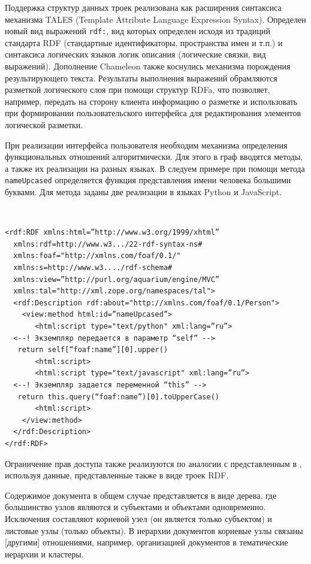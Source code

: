 \documentclass[utf8]{../IncArticle}
\newcommand{\e}[2][fcolor]{\textcolor{pcolor}{[}\textcolor{#1}{#2}\textcolor{pcolor}{]}}
\begin{document}
Поддержка структур данных троек реализована как расширения синтаксиса
механизма TALES (Template Attribute Language Expression
Syntax). Определен новый вид выражений \texttt{rdf:}, вид которых
определен исходя из традиций стандарта RDF (стандартные
идентификаторы, пространства имен и т.п.) и синтаксиса логических
языков логик описания (логические связки, вид выражений).  Дополнение
Chameleon также коснулись механизма порождения результирующего
текста. Результаты выполнения выражений обрамляются разметкой
логического слоя при помощи структур RDFa, что позволяет, например,
передать на сторону клиента информацию о разметке и использовать при
формировании пользовательского интерфейса для редактирования элементов
логической разметки.

При реализации интерфейса пользователя необходим механизма определения
функциональных отношений алгоритмически.  Для этого в граф вводятся
методы, а также их реализации на разных языках.  В следуем примере при
помощи метода \texttt{nameUpcased} определяется функция представления
имени человека большими буквами.  Для метода заданы две реализации в
языках Python и JavaScript.

\begingroup
\tt
\begin{verbatim}
<rdf:RDF xmlns:html=”http://www.w3.org/1999/xhtml”
  xmlns:rdf=http://www.w3.../22-rdf-syntax-ns#
  xmlns:foaf="http://xmlns.com/foaf/0.1/"
  xmlns:s=http://www.w3..../rdf-schema#
  xmlns:view=”http://purl.org/aquarium/engine/MVC”
  xmlns:tal="http://xml.zope.org/namespaces/tal">
  <rdf:Description rdf:about="http://xmlns.com/foaf/0.1/Person">
    <view:method html:id=”nameUpcased”>
       <html:script type="text/python" xml:lang=”ru”>
  <--! Экземпляр передается в параметр “self” -->
   return self[“foaf:name”][0].upper()
       <html:script>
       <html:script type="text/javascript" xml:lang=”ru”>
  <--! Экземпляр задается переменной “this” -->
   return this.query(“foaf:name”)[0].toUpperCase()
       <html:script>
    </view:method>
  </rdf:Description>
</rdf:RDF>
\end{verbatim}
\endgroup

Ограничение прав доступа также реализуются по аналогии с
представленным в \cite{b2:6,b2:7}, используя данные, представленные
также в виде троек RDF.

Содержимое документа в общем случае представляется в виде дерева, где
большинство узлов являются и субъектами и объектами
одновременно. Исключения составляют корневой узел (он является только
субъектом) и листовые узлы (только объекты).  В иерархии документов
корневые узлы связаны \e{другими} отношениями, например, организацией
документов в тематические иерархии и кластеры.
\end{document}
